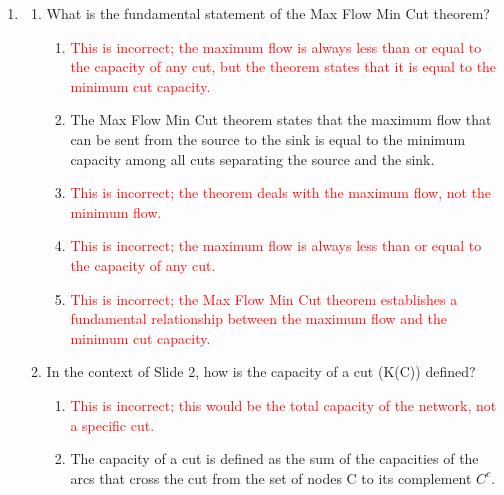 \documentclass{article}%
\newcommand{\incorrect}[1]{\textcolor{red}{#1}}
\begin{document}
\begin{enumerate}
\begin{enumerate}
\item The Max-Flow Min-Cut theorem states that the maximum flow that can be sent from the source to the sink in a network is equal to the minimum capacity among all cuts separating the source and the sink. This fundamental theorem provides a powerful tool for solving network flow problems.%
\item \incorrect{The Max-Flow Min-Cut theorem establishes a direct and fundamental relationship between the maximum flow and the minimum cut capacity.}%
\item \incorrect{The relationship is not problem-specific; it's a general theorem applicable to all network flow problems.}%
\end{enumerate}%
\vspace{1em}%
\item%
\begin{enumerate}%
\item What is the fundamental statement of the Max Flow Min Cut theorem?%
\begin{enumerate}%
\item \incorrect{This is incorrect; the maximum flow is always less than or equal to the capacity of any cut, but the theorem states that it is equal to the minimum cut capacity.}%
\item The Max Flow Min Cut theorem states that the maximum flow that can be sent from the source to the sink is equal to the minimum capacity among all cuts separating the source and the sink.%
\item \incorrect{This is incorrect; the theorem deals with the maximum flow, not the minimum flow.}%
\item \incorrect{This is incorrect; the maximum flow is always less than or equal to the capacity of any cut.}%
\item \incorrect{This is incorrect; the Max Flow Min Cut theorem establishes a fundamental relationship between the maximum flow and the minimum cut capacity.}%
\end{enumerate}%
\vspace{0.5em}%
\item In the context of Slide 2, how is the capacity of a cut (K(C)) defined?%
\begin{enumerate}%
\item \incorrect{This is incorrect; this would be the total capacity of the network, not a specific cut.}%
\item The capacity of a cut is defined as the sum of the capacities of the arcs that cross the cut from the set of nodes C to its complement $C^c$.%

\end{enumerate}
\end{enumerate}
\end{enumerate}
\end{document}
